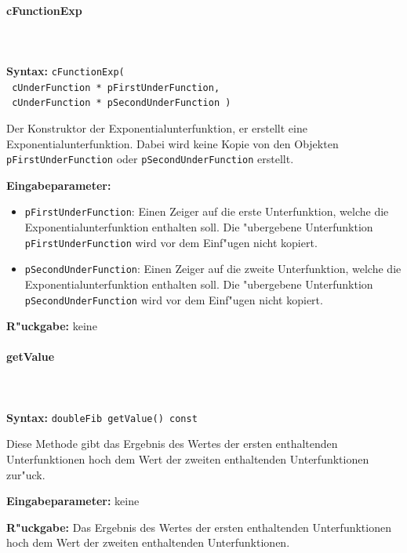 \paragraph{cFunctionExp}

\ \\\\\noindent
\textbf{Syntax:} \verb|cFunctionExp(| \\\verb| cUnderFunction * pFirstUnderFunction,| \\\verb| cUnderFunction * pSecondUnderFunction )|

\bigskip\noindent
Der Konstruktor der Exponentialunterfunktion, er erstellt eine Exponentialunterfunktion. Dabei wird keine Kopie von den Objekten  \verb|pFirstUnderFunction| oder \verb|pSecondUnderFunction| erstellt.

\bigskip\noindent
\textbf{Eingabeparameter:}
\begin{itemize}
 \item \verb|pFirstUnderFunction|: Einen Zeiger auf die erste Unterfunktion, welche die Exponentialunterfunktion enthalten soll. Die "ubergebene Unterfunktion \verb|pFirstUnderFunction| wird vor dem Einf"ugen nicht kopiert.
 \item \verb|pSecondUnderFunction|: Einen Zeiger auf die zweite Unterfunktion, welche die Exponentialunterfunktion enthalten soll. Die "ubergebene Unterfunktion \verb|pSecondUnderFunction| wird vor dem Einf"ugen nicht kopiert.
\end{itemize}

\bigskip\noindent
\textbf{R"uckgabe:} keine


\paragraph{getValue}

\ \\\\\noindent
\textbf{Syntax:} \verb|doubleFib getValue() const|

\bigskip\noindent
Diese Methode gibt das Ergebnis des Wertes der ersten enthaltenden Unterfunktionen hoch dem Wert der zweiten enthaltenden Unterfunktionen zur"uck.

\bigskip\noindent
\textbf{Eingabeparameter:} keine

\bigskip\noindent
\textbf{R"uckgabe:} Das Ergebnis des Wertes der ersten enthaltenden Unterfunktionen hoch dem Wert der zweiten enthaltenden Unterfunktionen.


